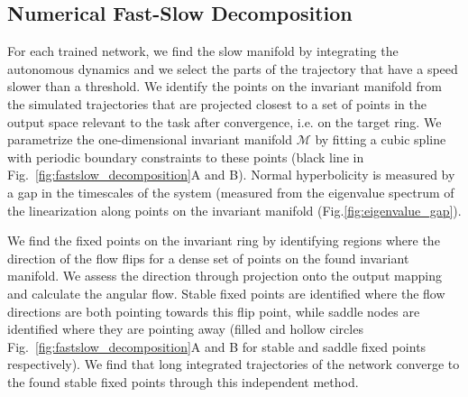 \documentclass{article} %
\newcounter{ct}
\newcommand{\manifold}{\mathcal{M}}
\theoremstyle{definition}
\theoremstyle{remark}
\begin{document}
\subsection{Numerical Fast-Slow Decomposition}\label{sec:fastslowmethod}
For each trained network, we find the slow manifold by integrating the autonomous dynamics and we select the parts of the trajectory that have a speed slower than a threshold.
%
We identify the points on the invariant manifold from the simulated trajectories that are projected closest to a set of points in the output space relevant to the task after convergence, i.e. on the target ring.
We parametrize the one-dimensional invariant manifold \(\manifold\) by fitting a cubic spline with periodic boundary constraints to these points (black line in Fig.~\ref{fig:fastslow_decomposition}A and B).
Normal hyperbolicity is measured by a gap in the timescales of the system (measured from the eigenvalue spectrum of the linearization along points on the invariant manifold (Fig.\ref{fig:eigenvalue_gap}).

We find the fixed points on the invariant ring by identifying regions where the direction of the flow flips for a dense set of points on the found invariant manifold.
We assess the direction through projection onto the output mapping and calculate the angular flow.
Stable fixed points are identified where the flow directions are both pointing towards this flip point,
while saddle nodes are identified where they are pointing away (filled and hollow circles Fig.~\ref{fig:fastslow_decomposition}A and B for stable and saddle fixed points respectively).
We find that long integrated trajectories of the network converge to the found stable fixed points through this independent method.
\end{document}

